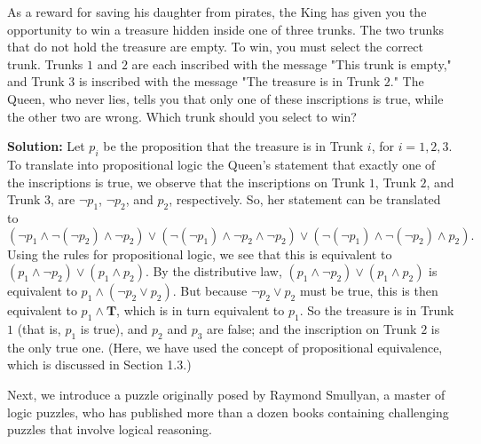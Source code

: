 \documentclass{Axon}
\begin{document}
\begin{example}
    As a reward for saving his daughter from pirates, the King has given you the opportunity to win a treasure hidden inside one of three trunks. The two trunks that do not hold the treasure are empty. To win, you must select the correct trunk. Trunks \(1\) and \(2\) are each inscribed with the message "This trunk is empty," and Trunk \(3\) is inscribed with the message "The treasure is in Trunk \(2\)." The Queen, who never lies, tells you that only one of these inscriptions is true, while the other two are wrong. Which trunk should you select to win?

    \noindent
    \textbf{Solution:}
    Let \(p_i\) be the proposition that the treasure is in Trunk \(i\), for \(i = 1, 2, 3\). To translate into propositional logic the Queen's statement that exactly one of the inscriptions is true, we observe that the inscriptions on Trunk \(1\), Trunk \(2\), and Trunk \(3\), are \(\lnot p_1\), \(\lnot p_2\), and \(p_2\), respectively. So, her statement can be translated to
    \begin{equation}
        (\lnot p_1 \land \lnot(\lnot p_2) \land \lnot p_2) \lor (\lnot(\lnot p_1) \land \lnot p_2 \land \lnot p_2) \lor (\lnot(\lnot p_1) \land \lnot(\lnot p_2) \land p_2).
    \end{equation}
    Using the rules for propositional logic, we see that this is equivalent to \((p_1 \land \lnot p_2) \lor (p_1 \land p_2)\). By the distributive law, \((p_1 \land \lnot p_2) \lor (p_1 \land p_2)\) is equivalent to \(p_1 \land (\lnot p_2 \lor p_2)\). But because \(\lnot p_2 \lor p_2\) must be true, this is then equivalent to \(p_1 \land \textbf{T}\), which is in turn equivalent to \(p_1\). So the treasure is in Trunk \(1\) (that is, \(p_1\) is true), and \(p_2\) and \(p_3\) are false; and the inscription on Trunk \(2\) is the only true one. (Here, we have used the concept of propositional equivalence, which is discussed in Section 1.3.)
\end{example}

Next, we introduce a puzzle originally posed by Raymond Smullyan, a master of logic puzzles, who has published more than a dozen books containing challenging puzzles that involve logical reasoning.
\end{document}
